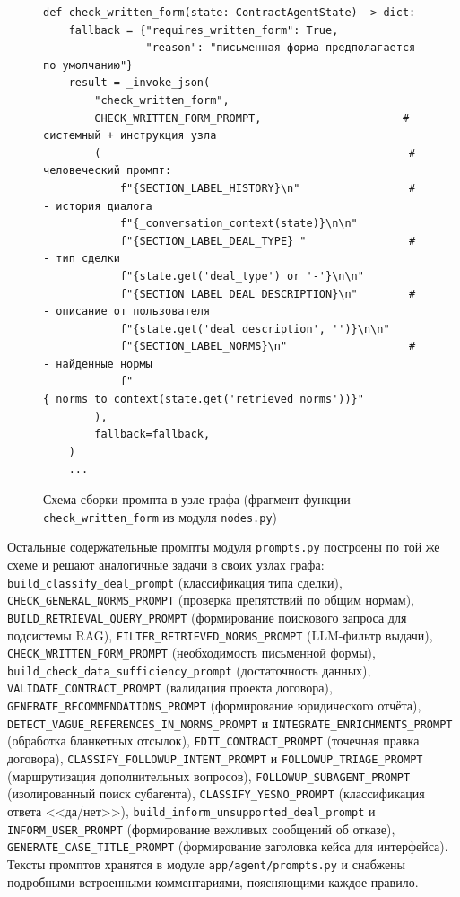 \begin{figure}[H]
\begin{lstlisting}[style=promptstyle, language={}]
def check_written_form(state: ContractAgentState) -> dict:
    fallback = {"requires_written_form": True,
                "reason": "письменная форма предполагается по умолчанию"}
    result = _invoke_json(
        "check_written_form",
        CHECK_WRITTEN_FORM_PROMPT,                      # системный + инструкция узла
        (                                                # человеческий промпт:
            f"{SECTION_LABEL_HISTORY}\n"                 #   - история диалога
            f"{_conversation_context(state)}\n\n"
            f"{SECTION_LABEL_DEAL_TYPE} "                #   - тип сделки
            f"{state.get('deal_type') or '-'}\n\n"
            f"{SECTION_LABEL_DEAL_DESCRIPTION}\n"        #   - описание от пользователя
            f"{state.get('deal_description', '')}\n\n"
            f"{SECTION_LABEL_NORMS}\n"                   #   - найденные нормы
            f"{_norms_to_context(state.get('retrieved_norms'))}"
        ),
        fallback=fallback,
    )
    ...
\end{lstlisting}
\caption{Схема сборки промпта в узле графа (фрагмент функции \texttt{check\_written\_form} из модуля \texttt{nodes.py})}
\label{src:prompt-assembly}
\end{figure}

Остальные содержательные промпты модуля \texttt{prompts.py} построены по той же схеме и решают аналогичные задачи в своих узлах графа: \texttt{build\_classify\_deal\_prompt} (классификация типа сделки), \texttt{CHECK\_GENERAL\_NORMS\_PROMPT} (проверка препятствий по общим нормам), \texttt{BUILD\_RETRIEVAL\_QUERY\_PROMPT} (формирование поискового запроса для подсистемы RAG), \texttt{FILTER\_RETRIEVED\_NORMS\_PROMPT} (LLM-фильтр выдачи), \texttt{CHECK\_WRITTEN\_FORM\_PROMPT} (необходимость письменной формы), \texttt{build\_check\_data\_sufficiency\_prompt} (достаточность данных), \texttt{VALIDATE\_CONTRACT\_PROMPT} (валидация проекта договора), \texttt{GENERATE\_RECOMMENDATIONS\_PROMPT} (формирование юридического отчёта), \texttt{DETECT\_VAGUE\_REFERENCES\_IN\_NORMS\_PROMPT} и \texttt{INTEGRATE\_ENRICHMENTS\_PROMPT} (обработка бланкетных отсылок), \texttt{EDIT\_CONTRACT\_PROMPT} (точечная правка договора), \texttt{CLASSIFY\_FOLLOWUP\_INTENT\_PROMPT} и \texttt{FOLLOWUP\_TRIAGE\_PROMPT} (маршрутизация дополнительных вопросов), \texttt{FOLLOWUP\_SUBAGENT\_PROMPT} (изолированный поиск субагента), \texttt{CLASSIFY\_YESNO\_PROMPT} (классификация ответа <<да/нет>>), \texttt{build\_inform\_unsupported\_deal\_prompt} и \texttt{INFORM\_USER\_PROMPT} (формирование вежливых сообщений об отказе), \texttt{GENERATE\_CASE\_TITLE\_PROMPT} (формирование заголовка кейса для интерфейса). Тексты промптов хранятся в модуле \texttt{app/agent/prompts.py} и снабжены подробными встроенными комментариями, поясняющими каждое правило.
